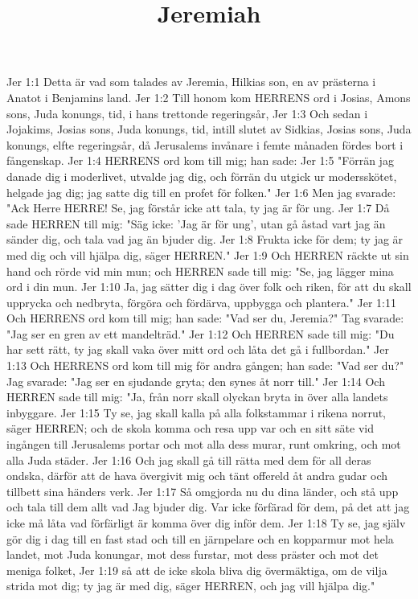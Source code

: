 

\title{Jeremiah}

Jer 1:1  Detta är vad som talades av Jeremia, Hilkias son, en av prästerna i Anatot i Benjamins land.
Jer 1:2  Till honom kom HERRENS ord i Josias, Amons sons, Juda konungs, tid, i hans trettonde regeringsår,
Jer 1:3  Och sedan i Jojakims, Josias sons, Juda konungs, tid, intill slutet av Sidkias, Josias sons, Juda konungs, elfte regeringsår, då Jerusalems invånare i femte månaden fördes bort i fångenskap.
Jer 1:4  HERRENS ord kom till mig; han sade:
Jer 1:5  "Förrän jag danade dig i moderlivet, utvalde jag dig, och förrän du utgick ur modersskötet, helgade jag dig; jag satte dig till en profet för folken."
Jer 1:6  Men jag svarade: "Ack Herre HERRE! Se, jag förstår icke att tala, ty jag är för ung.
Jer 1:7  Då sade HERREN till mig: "Säg icke: 'Jag är för ung', utan gå åstad vart jag än sänder dig, och tala vad jag än bjuder dig.
Jer 1:8  Frukta icke för dem; ty jag är med dig och vill hjälpa dig, säger HERREN."
Jer 1:9  Och HERREN räckte ut sin hand och rörde vid min mun; och HERREN sade till mig: "Se, jag lägger mina ord i din mun.
Jer 1:10  Ja, jag sätter dig i dag över folk och riken, för att du skall upprycka och nedbryta, förgöra och fördärva, uppbygga och plantera."
Jer 1:11  Och HERRENS ord kom till mig; han sade: "Vad ser du, Jeremia?" Tag svarade: "Jag ser en gren av ett mandelträd."
Jer 1:12  Och HERREN sade till mig: "Du har sett rätt, ty jag skall vaka över mitt ord och låta det gå i fullbordan."
Jer 1:13  Och HERRENS ord kom till mig för andra gången; han sade: "Vad ser du?" Jag svarade: "Jag ser en sjudande gryta; den synes åt norr till."
Jer 1:14  Och HERREN sade till mig: "Ja, från norr skall olyckan bryta in över alla landets inbyggare.
Jer 1:15  Ty se, jag skall kalla på alla folkstammar i rikena norrut, säger HERREN; och de skola komma och resa upp var och en sitt säte vid ingången till Jerusalems portar och mot alla dess murar, runt omkring, och mot alla Juda städer.
Jer 1:16  Och jag skall gå till rätta med dem för all deras ondska, därför att de hava övergivit mig och tänt offereld åt andra gudar och tillbett sina händers verk.
Jer 1:17  Så omgjorda nu du dina länder, och stå upp och tala till dem allt vad Jag bjuder dig. Var icke förfärad för dem, på det att jag icke må låta vad förfärligt är komma över dig inför dem.
Jer 1:18  Ty se, jag själv gör dig i dag till en fast stad och till en järnpelare och en kopparmur mot hela landet, mot Juda konungar, mot dess furstar, mot dess präster och mot det meniga folket,
Jer 1:19  så att de icke skola bliva dig övermäktiga, om de vilja strida mot dig; ty jag är med dig, säger HERREN, och jag vill hjälpa dig."

